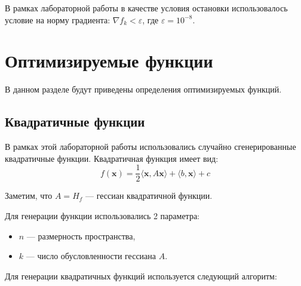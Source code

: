 \documentclass[12pt]{article}
\begin{document}
В рамках лабораторной работы в качестве условия остановки использовалось условие на норму градиента: $\nabla f_k < \varepsilon$, где $\varepsilon = 10^{-8}$.

\section {Оптимизируемые функции}
В данном разделе будут приведены определения оптимизируемых функций.
\subsection{Квадратичные функции}
В рамках этой лабораторной работы использовались случайно сгенерированные квадратичные функции. Квадратичная функция имеет вид:
\begin{equation*}
f(\textbf{x}) = \frac12\langle \textbf{x}, A\textbf{x} \rangle + \langle b, \textbf{x} \rangle + c
\end{equation*}

Заметим, что $A = H_f$ --- гессиан квадратичной функции.

Для генерации функции использовались 2 параметра:
\begin{itemize}
    \item $n$ --- размерность пространства,
    \item $k$ --- число обусловленности гессиана $A$.
\end{itemize}

Для генерации квадратичных функций используется следующий алгоритм:
\end{document}
